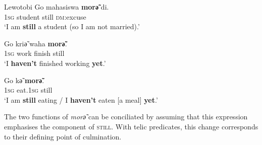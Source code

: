 \begin{exe}
	\ex
	\begin{xlist}
	\exi{}Lewotobi
	\ex\label{exNotYetLewotobi1}
	 \gll Go mahasiswa \textbf{morә̃} di.\\
	 1\textsc{sg} student still \textsc{dm}:excuse\\
	 \glt \lq I am \textbf{still} a student (so I am not married).'

	\ex\label{exNotYetLewotobi2}
	\gll Go kriә̃ waha \textbf{morә̃}.\\
	1\textsc{sg} work finish still\\
	\glt \lq I \textbf{haven’t} finished working \textbf{yet}.'

	\ex\label{exNotYetLewotobi3}
	\gll Go kә̃ \textbf{morә̃}.\\
	1\textsc{sg} eat.1\textsc{sg} still\\
	\glt \lq I am \textbf{still} eating / I \textbf{haven’t} eaten [a meal] \textbf{yet}.\rq
	\\\parencite[415–416, 434]{Nagaya2012}
	\end{xlist}
\end{exe}

The two functions of \textit{morә̃} can be conciliated by assuming that this expression emphasises the  component of \textsc{still}. With telic predicates, this change corresponds to their defining point of culmination.

